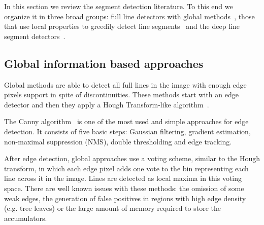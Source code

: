 \documentclass[preprint,12pt]{elsarticle}
\begin{document}
In this section we review the segment detection literature. To this end we organize it in three broad groups: full line detectors with global methods~\cite{matas2000robust, tal2012accurate,fernandes2008real, almazan2017mcmlsd}, those that use local properties to greedily detect line segments~\cite{grompone2010lsd, akinlar2011edlines, Ding2016OTLines, cho2017novel, zhang2021ag3line} and the deep line segment detectors~\cite{huang2018learning, xue2019learning, zhou2019end, newell2016stacked, xue2020hawp, xue2020hawp, dai2021fully, xu2021line, pautrat2021sold2}.

\subsection{Global information based approaches} \label{sec:full_line_soa}

Global methods are able to detect all full lines in the image with enough edge pixels support in spite of discontinuities. These methods start with an edge detector and then they apply a Hough Transform-like algorithm~\cite{ballard1987generalizing}. 

The Canny algorithm~\cite{canny1987computational} is one of the most used and simple approaches for edge detection. It consists of five basic steps: Gaussian filtering, gradient estimation, non-maximal suppression (NMS), double thresholding and edge tracking.

After edge detection, global approaches use a voting scheme, similar to the Hough transform, in which each edge pixel adds one vote to the bin representing each line across it in the image. Lines are detected as local maxima in this voting space.
There are well known issues with these methods: the omission of some weak edges, the generation of false positives in regions with high edge density (e.g. tree leaves) or the large amount of memory required to store the accumulators.
\end{document}
